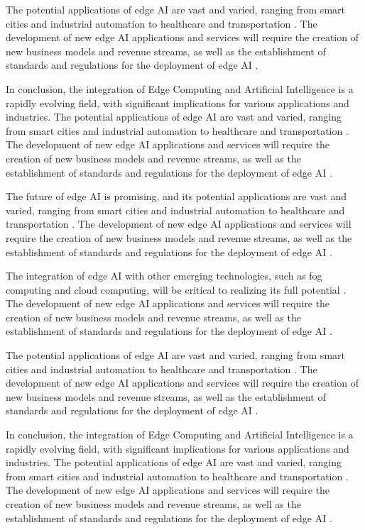 \documentclass[11pt,a4paper]{article}
\begin{document}
The potential applications of edge AI are vast and varied, ranging from smart cities and industrial automation to healthcare and transportation \cite{arxiv:2101.10417}. The development of new edge AI applications and services will require the creation of new business models and revenue streams, as well as the establishment of standards and regulations for the deployment of edge AI \cite{arxiv:2105.03559}. 

In conclusion, the integration of Edge Computing and Artificial Intelligence is a rapidly evolving field, with significant implications for various applications and industries. The potential applications of edge AI are vast and varied, ranging from smart cities and industrial automation to healthcare and transportation \cite{arxiv:2206.07164}. The development of new edge AI applications and services will require the creation of new business models and revenue streams, as well as the establishment of standards and regulations for the deployment of edge AI \cite{arxiv:2305.01974}. 

The future of edge AI is promising, and its potential applications are vast and varied, ranging from smart cities and industrial automation to healthcare and transportation \cite{arxiv:2301.07803}. The development of new edge AI applications and services will require the creation of new business models and revenue streams, as well as the establishment of standards and regulations for the deployment of edge AI \cite{arxiv:2309.03420}. 

The integration of edge AI with other emerging technologies, such as fog computing and cloud computing, will be critical to realizing its full potential \cite{arxiv:2403.19729}. The development of new edge AI applications and services will require the creation of new business models and revenue streams, as well as the establishment of standards and regulations for the deployment of edge AI \cite{arxiv:2306.17170}. 

The potential applications of edge AI are vast and varied, ranging from smart cities and industrial automation to healthcare and transportation \cite{arxiv:2510.10166}. The development of new edge AI applications and services will require the creation of new business models and revenue streams, as well as the establishment of standards and regulations for the deployment of edge AI \cite{arxiv:2501.14823}. 

In conclusion, the integration of Edge Computing and Artificial Intelligence is a rapidly evolving field, with significant implications for various applications and industries. The potential applications of edge AI are vast and varied, ranging from smart cities and industrial automation to healthcare and transportation \cite{arxiv:2502.15775}. The development of new edge AI applications and services will require the creation of new business models and revenue streams, as well as the establishment of standards and regulations for the deployment of edge AI \cite{arxiv:2403.15665}. 
\end{document}
